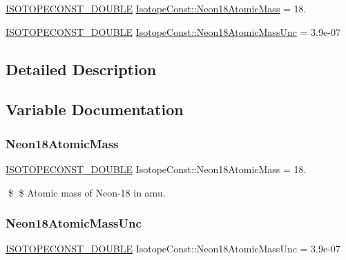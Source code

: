 \begin{DoxyCompactItemize}
\item 
\mbox{\hyperlink{group___isotope_const-_macros_ga8f45a7272ce02c0b4c65c44636ed719a}{I\+S\+O\+T\+O\+P\+E\+C\+O\+N\+S\+T\+\_\+\+D\+O\+U\+B\+LE}} \mbox{\hyperlink{group___isotope_const-_neon-_ne18_gadc150acbd90fcf0f6818e42fcd96d0cc}{Isotope\+Const\+::\+Neon18\+Atomic\+Mass}} = 18.
\item 
\mbox{\hyperlink{group___isotope_const-_macros_ga8f45a7272ce02c0b4c65c44636ed719a}{I\+S\+O\+T\+O\+P\+E\+C\+O\+N\+S\+T\+\_\+\+D\+O\+U\+B\+LE}} \mbox{\hyperlink{group___isotope_const-_neon-_ne18_ga258f6613923e857588336cc39835b26e}{Isotope\+Const\+::\+Neon18\+Atomic\+Mass\+Unc}} = 3.\+9e-\/07
\end{DoxyCompactItemize}


\subsection{Detailed Description}


\subsection{Variable Documentation}
\mbox{\label{group___isotope_const-_neon-_ne18_gadc150acbd90fcf0f6818e42fcd96d0cc}} 
\subsubsection{\texorpdfstring{Neon18\+Atomic\+Mass}{Neon18AtomicMass}}
{\footnotesize\ttfamily \mbox{\hyperlink{group___isotope_const-_macros_ga8f45a7272ce02c0b4c65c44636ed719a}{I\+S\+O\+T\+O\+P\+E\+C\+O\+N\+S\+T\+\_\+\+D\+O\+U\+B\+LE}} Isotope\+Const\+::\+Neon18\+Atomic\+Mass = 18.}

\$ \$ Atomic mass of Neon-\/18 in amu. \mbox{\label{group___isotope_const-_neon-_ne18_ga258f6613923e857588336cc39835b26e}} 
\subsubsection{\texorpdfstring{Neon18\+Atomic\+Mass\+Unc}{Neon18AtomicMassUnc}}
{\footnotesize\ttfamily \mbox{\hyperlink{group___isotope_const-_macros_ga8f45a7272ce02c0b4c65c44636ed719a}{I\+S\+O\+T\+O\+P\+E\+C\+O\+N\+S\+T\+\_\+\+D\+O\+U\+B\+LE}} Isotope\+Const\+::\+Neon18\+Atomic\+Mass\+Unc = 3.\+9e-\/07}

